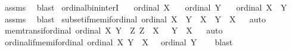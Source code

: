 \begin{isabellebody}
\ assms\ \isamarkupfalse%
\ blast%
\endisatagproof
{\isafoldproof}%
%
\isadelimproof
\isanewline
%
\endisadelimproof
\isanewline
{}\isamarkupfalse%
\ ordinal{\isacharunderscore}{\kern0pt}bin{\isacharunderscore}{\kern0pt}interI{\isacharcolon}{\kern0pt}\isanewline
\ \ \ {\isachardoublequoteopen}ordinal\ X{\isachardoublequoteclose}\isanewline
\ \ \ {\isachardoublequoteopen}ordinal\ Y{\isachardoublequoteclose}\isanewline
\ \ \ {\isachardoublequoteopen}ordinal\ {\isacharparenleft}{\kern0pt}X\ {\isasyminter}\ Y{\isacharparenright}{\kern0pt}{\isachardoublequoteclose}\isanewline
%
\isadelimproof
\ \ %
\endisadelimproof
%
\isatagproof
{}\isamarkupfalse%
\ assms\ \isamarkupfalse%
\ blast%
\endisatagproof
{\isafoldproof}%
%
\isadelimproof
\isanewline
%
\endisadelimproof
\isanewline
{}\isamarkupfalse%
\ subset{\isacharunderscore}{\kern0pt}if{\isacharunderscore}{\kern0pt}mem{\isacharunderscore}{\kern0pt}if{\isacharunderscore}{\kern0pt}ordinal{\isacharcolon}{\kern0pt}\ {\isachardoublequoteopen}ordinal\ X\ {\isasymLongrightarrow}\ Y\ {\isasymin}\ X\ {\isasymLongrightarrow}\ Y\ {\isasymsubseteq}\ X{\isachardoublequoteclose}%
\isadelimproof
\ %
\endisadelimproof
%
\isatagproof
{}\isamarkupfalse%
\ auto%
\endisatagproof
{\isafoldproof}%
%
\isadelimproof
%
\endisadelimproof
\isanewline
\isanewline
{}\isamarkupfalse%
\ mem{\isacharunderscore}{\kern0pt}trans{\isacharunderscore}{\kern0pt}if{\isacharunderscore}{\kern0pt}ordinal{\isacharcolon}{\kern0pt}\ {\isachardoublequoteopen}{\isasymlbrakk}ordinal\ X{\isacharsemicolon}{\kern0pt}\ Y\ {\isasymin}\ Z{\isacharsemicolon}{\kern0pt}\ Z\ {\isasymin}\ X{\isasymrbrakk}\ \ {\isasymLongrightarrow}\ Y\ {\isasymin}\ X{\isachardoublequoteclose}%
\isadelimproof
\ %
\endisadelimproof
%
\isatagproof
{}\isamarkupfalse%
\ auto%
\endisatagproof
{\isafoldproof}%
%
\isadelimproof
%
\endisadelimproof
\isanewline
\isanewline
{}\isamarkupfalse%
\ ordinal{\isacharunderscore}{\kern0pt}if{\isacharunderscore}{\kern0pt}mem{\isacharunderscore}{\kern0pt}if{\isacharunderscore}{\kern0pt}ordinal{\isacharcolon}{\kern0pt}\ {\isachardoublequoteopen}{\isasymlbrakk}ordinal\ X{\isacharsemicolon}{\kern0pt}\ Y\ {\isasymin}\ X{\isasymrbrakk}\ \ {\isasymLongrightarrow}\ ordinal\ Y{\isachardoublequoteclose}\isanewline
%
\isadelimproof
\ \ %
\endisadelimproof
%
\isatagproof
{}\isamarkupfalse%
\ blast%
\endisatagproof
{\isafoldproof}%
%
\isadelimproof
\isanewline
%
\endisadelimproof

\end{isabellebody}
